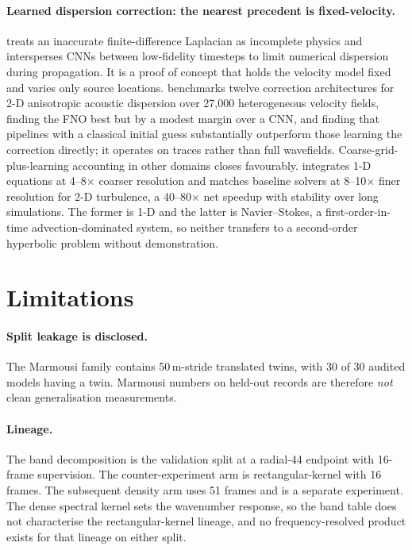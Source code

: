 \documentclass[11pt,a4paper]{article}
\begin{document}
\paragraph{Learned dispersion correction: the nearest precedent is fixed-velocity.}
\cite{nnaugmented} treats an inaccurate finite-difference Laplacian as incomplete physics and
intersperses CNNs between low-fidelity timesteps to limit numerical dispersion during
propagation. It is a proof of concept that holds the velocity model fixed and varies only
source locations. \cite{dispersion} benchmarks twelve correction architectures for 2-D
anisotropic acoustic dispersion over 27{,}000 heterogeneous velocity fields, finding the FNO
best but by a modest margin over a CNN, and finding that pipelines with a classical initial
guess substantially outperform those learning the correction directly; it operates on traces
rather than full wavefields. Coarse-grid-plus-learning accounting in other domains closes
favourably. \cite{barsinai} integrates 1-D equations at 4--8$\times$ coarser resolution and
\cite{kochkov} matches baseline solvers at 8--10$\times$ finer resolution for 2-D turbulence,
a 40--80$\times$ net speedup with stability over long simulations. The former is 1-D and
the latter is Navier--Stokes, a first-order-in-time advection-dominated system, so neither
transfers to a second-order hyperbolic problem without demonstration.

\section{Limitations}
\label{sec:limits}

\paragraph{Split leakage is disclosed.} The Marmousi family contains 50\,m-stride translated
twins, with 30 of 30 audited models having a twin. Marmousi numbers on held-out records are
therefore \emph{not} clean generalisation measurements.

\paragraph{Lineage.} The band decomposition is the validation split at a radial-44 endpoint
with 16-frame supervision. The counter-experiment arm is rectangular-kernel with 16 frames.
The subsequent density arm uses 51 frames and is a separate experiment.
The dense spectral kernel sets the wavenumber response, so the band table does not
characterise the rectangular-kernel lineage, and no frequency-resolved product exists for that
lineage on either split.
\end{document}
